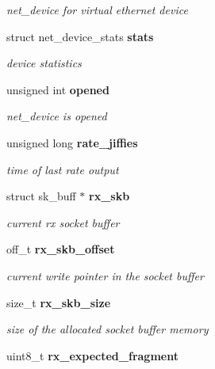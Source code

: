 \begin{DoxyCompactItemize}
\begin{DoxyCompactList}\small\item\em net\-\_\-device for virtual ethernet device \end{DoxyCompactList}\item 
struct net\-\_\-device\-\_\-stats {\bf stats}\label{structec__eoe_a859cf84e58d4407062e2d96c5b44a480}

\begin{DoxyCompactList}\small\item\em device statistics \end{DoxyCompactList}\item 
unsigned int {\bf opened}\label{structec__eoe_a174f57afa262c3a4b21b1e86268442f0}

\begin{DoxyCompactList}\small\item\em net\-\_\-device is opened \end{DoxyCompactList}\item 
unsigned long {\bf rate\-\_\-jiffies}\label{structec__eoe_aaf40c510901fb2cb0765518c2c8ed229}

\begin{DoxyCompactList}\small\item\em time of last rate output \end{DoxyCompactList}\item 
struct sk\-\_\-buff $\ast$ {\bf rx\-\_\-skb}\label{structec__eoe_aaed9dafdc5f3ae99a04e3941408e9e00}

\begin{DoxyCompactList}\small\item\em current rx socket buffer \end{DoxyCompactList}\item 
off\-\_\-t {\bf rx\-\_\-skb\-\_\-offset}\label{structec__eoe_a7647dd32da557fbba05bd0dd1153d2a9}

\begin{DoxyCompactList}\small\item\em current write pointer in the socket buffer \end{DoxyCompactList}\item 
size\-\_\-t {\bf rx\-\_\-skb\-\_\-size}\label{structec__eoe_a4ad33f25a05ae6b8664306c8bb12d30d}

\begin{DoxyCompactList}\small\item\em size of the allocated socket buffer memory \end{DoxyCompactList}\item 
uint8\-\_\-t {\bf rx\-\_\-expected\-\_\-fragment}\label{structec__eoe_a88d376026ca84277ec5fa85c31ab1c17}


\end{DoxyCompactItemize}
